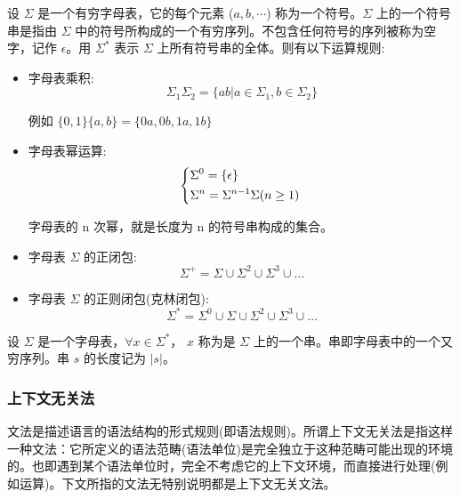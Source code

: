 设 $\Sigma$ 是一个有穷字母表，它的每个元素 ($a, b ,\cdots$) 称为一个符号。$\Sigma$ 上的一个符号串是指由 $\Sigma$ 中的符号所构成的一个有穷序列。不包含任何符号的序列被称为空字，记作 $\epsilon$。用 $\Sigma^*$ 表示 $\Sigma$ 上所有符号串的全体。则有以下运算规则:

\begin{itemize}
    \item 字母表乘积:
          \begin{equation}
              \Sigma_1 \Sigma_2 = \{ab|a\in \Sigma_1 , b \in \Sigma_2\}
          \end{equation}

          例如 $\{0,1\}\{a,b\} = \{0a,0b,1a,1b\}$
    \item 字母表幂运算:
          \begin{equation}
              \left\{
              \begin{aligned}
                   & \Sigma^{0} = \{\epsilon\}                      \\
                   & \Sigma^{n} =  \Sigma^{n-1}  \Sigma (n \geq 1 )
              \end{aligned}
              \right. \\
          \end{equation}

          字母表的 n 次幂，就是长度为 n 的符号串构成的集合。
    \item 字母表 $\Sigma$ 的正闭包:
          \begin{equation}
              \Sigma^{+} = \Sigma \cup \Sigma^{2} \cup \Sigma^{3} \cup \dots
          \end{equation}
    \item 字母表 $\Sigma$ 的正则闭包(克林闭包):
          \begin{equation}
              \Sigma^{*} =  \Sigma^{0} \cup \Sigma \cup \Sigma^{2} \cup \Sigma^{3} \cup \dots
          \end{equation}
\end{itemize}

设 $\Sigma$ 是一个字母表，$\forall x \in \Sigma^{*}$， $x$ 称为是 $\Sigma$ 上的一个串。串即字母表中的一个又穷序列。串 $s$ 的长度记为 $|s|$。

\subsubsection{上下文无关法}

文法是描述语言的语法结构的形式规则(即语法规则)。所谓上下文无关法是指这样一种文法：它所定义的语法范畴(语法单位)是完全独立于这种范畴可能出现的环境的。也即遇到某个语法单位时，完全不考虑它的上下文环境，而直接进行处理(例如运算)。下文所指的文法无特别说明都是上下文无关文法。


